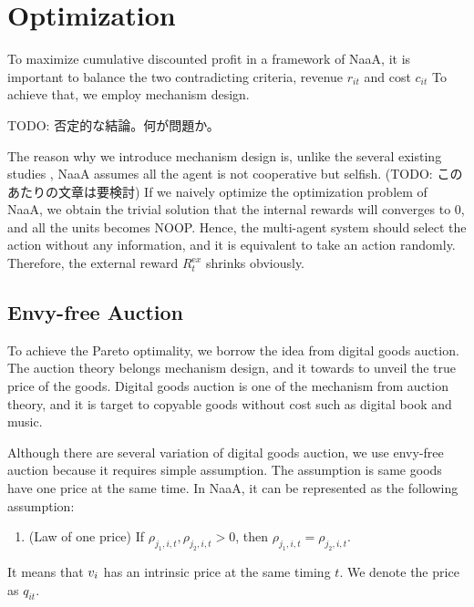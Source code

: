 \section{Optimization}
To maximize cumulative discounted profit in a framework of NaaA,
it is important to balance the two contradicting criteria, revenue $r_{it}$ and cost $c_{it}$
To achieve that, we employ mechanism design.

TODO: 否定的な結論。何が問題か。


The reason why we introduce mechanism design is, unlike the several existing studies \citep{sukhbaatar2016learning}, NaaA assumes all the agent is not cooperative but selfish.
(TODO: このあたりの文章は要検討)
If we naively optimize the optimization problem of NaaA, we obtain the trivial solution that the internal rewards will converges to 0, and all the units becomes NOOP.
Hence, the multi-agent system should select the action without any information, and it is equivalent to take an action randomly.
Therefore, the external reward $R_t^{\mathrm ex}$ shrinks obviously.


\subsection{Envy-free Auction}
To achieve the Pareto optimality, we borrow the idea from digital goods auction.
The auction theory belongs mechanism design, and it towards to unveil the true price of the goods.
Digital goods auction is one of the mechanism from auction theory,
and it is target to copyable goods without cost such as digital book and music.

Although there are several variation of digital goods auction,
we use envy-free auction \citep{guruswami2005profit} because it requires simple assumption.
The assumption is same goods have one price at the same time.
In NaaA, it can be represented as the following assumption:
\begin{enumerate}
\renewcommand{\labelenumi}{N\arabic{enumi}:}
\setcounter{enumi}{4}
\item (Law of one price)
	If $\rho_{j_1,i,t}, \rho_{j_2,i,t} > 0$, then $\rho_{j_1,i,t} = \rho_{j_2,i,t}$.
\end{enumerate}
It means that $v_{i}$ has an intrinsic price at the same timing $t$.
We denote the price as $q_{it}$.

